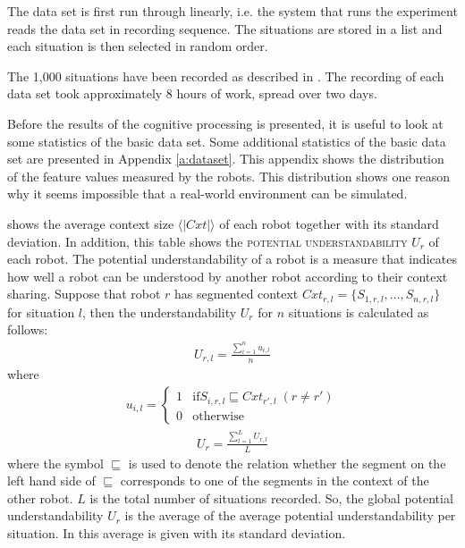 The data set is first run through linearly, i.e. the system that runs
the experiment reads the data set in recording sequence. 
The situations are stored in a list and each situation is then selected in
random order.

The 1,000 situations have been recorded as described in . The recording of each data set took approximately 8 hours of work, spread over two days.

Before the results of the cognitive processing is presented, it is useful to look at some statistics of the basic data set. Some additional statistics of the basic data set are presented in Appendix \ref{a:dataset}. This appendix shows the distribution of the feature values measured by the robots. This distribution shows one reason why it seems impossible that a real-world environment can be simulated.

 shows the average context size $\langle |Cxt| \rangle$ of each robot together with its standard deviation. In addition, this table shows the {\scshape potential understandability} $U_r$ of each robot. The potential understandability of a robot is a measure that indicates how well a robot can be understood by another robot according to their context sharing. Suppose that robot $r$ has segmented context $Cxt_{r,l}=\{S_{1,r,l},\ldots,S_{n,r,l}\}$ for situation $l$, then the understandability $U_r$ for $n$ situations is calculated as follows:
\begin{eqnarray}
U_{r,l}=\frac{\sum_{i=1}^n u_{i,l}}{n}
\end{eqnarray}
where
\begin{eqnarray}
u_{i,l} = \left \{ \begin{array}{rl}
1 & \mbox{if} S_{i,r,l} \sqsubseteq Cxt_{r',l} \; (r \neq r')\\
0 & \mbox{otherwise}
\end{array} \right.
\end{eqnarray}
\begin{eqnarray}
U_r = \frac{\sum_{l=1}^L U_{r,l}}{L}
\end{eqnarray}
\noindent where the symbol $\sqsubseteq$ is used to denote the relation whether the segment on the left hand side of $\sqsubseteq$ corresponds to one of the segments in the context of the other robot. $L$ is the total number of situations recorded. So, the global potential understandability $U_r$ is the average of the average potential understandability per situation. In  this average is given with its standard deviation.

